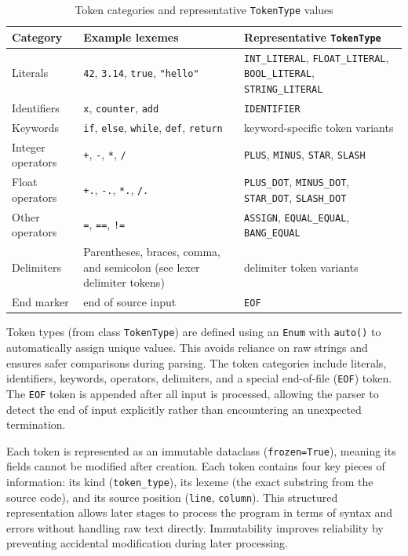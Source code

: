 \begin{table}[H]
\centering
\caption{Token categories and representative \texttt{TokenType} values}
\label{tab:token-categories}
\small
\begin{tabular}{>{\raggedright\arraybackslash}p{}>{\raggedright\arraybackslash}p{}>{\raggedright\arraybackslash}p{}}
\toprule
Category & Example lexemes & Representative \texttt{TokenType} \\
\midrule
Literals &
\texttt{42}, \texttt{3.14}, \texttt{true}, \texttt{"hello"} &
\texttt{INT\_LITERAL}, \texttt{FLOAT\_LITERAL}, \texttt{BOOL\_LITERAL},
\texttt{STRING\_LITERAL} \\
Identifiers &
\texttt{x}, \texttt{counter}, \texttt{add} &
\texttt{IDENTIFIER} \\
Keywords &
\texttt{if}, \texttt{else}, \texttt{while}, \texttt{def},
\texttt{return} &
keyword-specific token variants \\
Integer operators &
\texttt{+}, \texttt{-}, \texttt{*}, \texttt{/} &
\texttt{PLUS}, \texttt{MINUS}, \texttt{STAR}, \texttt{SLASH} \\
Float operators &
\texttt{+.}, \texttt{-.}, \texttt{*.}, \texttt{/.} &
\texttt{PLUS\_DOT}, \texttt{MINUS\_DOT}, \texttt{STAR\_DOT}, \texttt{SLASH\_DOT} \\
Other operators &
\texttt{=}, \texttt{==}, \texttt{!=} &
\texttt{ASSIGN}, \texttt{EQUAL\_EQUAL}, \texttt{BANG\_EQUAL} \\
Delimiters &
Parentheses, braces, comma, and semicolon (see lexer delimiter tokens) &
delimiter token variants \\
End marker & end of source input & \texttt{EOF} \\
\bottomrule
\end{tabular}
\end{table}

Token types (from class \texttt{TokenType}) are defined using an \texttt{Enum}
with \texttt{auto()} to automatically assign unique values. This avoids reliance
on raw strings and ensures safer comparisons during parsing. The token
categories include literals, identifiers, keywords, operators, delimiters, and
a special end-of-file (\texttt{EOF}) token. The \texttt{EOF} token is appended
after all input is processed, allowing the parser to detect the end of input
explicitly rather than encountering an unexpected termination.

Each token is represented as an immutable dataclass (\texttt{frozen=True}),
meaning its fields cannot be modified after creation. Each token contains four
key pieces of information: its kind (\texttt{token\_type}), its lexeme (the
exact substring from the source code), and its source position (\texttt{line},
\texttt{column}). This structured representation allows later stages to
process the program in terms of syntax and errors without handling raw text
directly. Immutability improves reliability by preventing accidental
modification during later processing.

